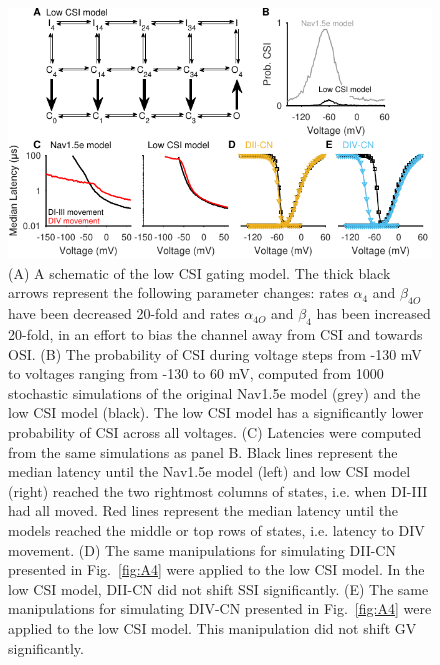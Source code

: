\begin{figure}[t]
    \centering
    \includegraphics[width=115mm]{Figures/AppendixA/figure07.pdf}
    \caption{
    (A) A schematic of the low CSI gating model. The thick black arrows represent the following parameter changes: rates $\alpha_4$ and $\beta_{4O}$ have been decreased 20-fold and rates $\alpha_{4O}$ and $\beta_4$ has been increased 20-fold, in an effort to bias the channel away from CSI and towards OSI.
    (B) The probability of CSI during voltage steps from -130 mV to voltages ranging from -130 to 60 mV, computed from 1000 stochastic simulations of the original Nav1.5e model (grey) and the low CSI model (black). The low CSI model has a significantly lower probability of CSI across all voltages.
    (C) Latencies were computed from the same simulations as panel B. Black lines represent the median latency until the Nav1.5e model (left) and low CSI model (right) reached the two rightmost columns of states, i.e. when DI-III had all moved. Red lines represent the median latency until the models reached the middle or top rows of states, i.e. latency to DIV movement.
    (D) The same manipulations for simulating DII-CN presented in Fig.~\ref{fig:A4} were applied to the low CSI model. In the low CSI model, DII-CN did not shift SSI significantly.
    (E) The same manipulations for simulating DIV-CN presented in Fig.~\ref{fig:A4} were applied to the low CSI model. This manipulation did not shift GV significantly.}
    \label{fig:A7}
\end{figure}

